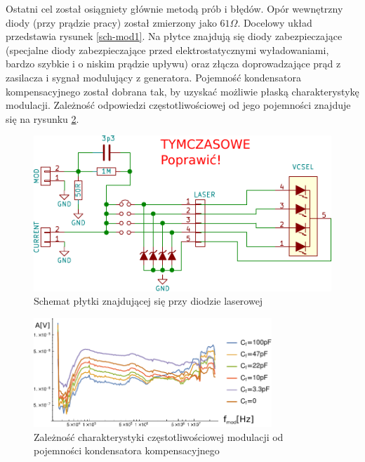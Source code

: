 \documentclass[a4paper,10pt]{article}
\begin{document}
Ostatni cel został osiągniety głównie metodą prób i błędów. Opór wewnętrzny diody (przy prądzie pracy) został zmierzony jako $61 \Omega$.
Docelowy układ przedstawia rysunek \ref{sch-mod1}. Na płytce znajdują się diody zabezpieczające (specjalne diody zabezpieczające przed elektrostatycznymi wyładowaniami, bardzo szybkie i o niskim prądzie upływu) oraz złącza doprowadzające prąd z zasilacza i sygnał modulujący z generatora. Pojemność kondensatora kompensacyjnego został dobrana tak, by uzyskać możliwie płaską charakterystykę modulacji. Zależność odpowiedzi częstotliwościowej od jego pojemności znajduje się na rysunku \ref{wyk-mod}.

\begin{figure}
\begin{center}
 \includegraphics{./obrazki/dings.pdf}
\end{center}
\caption{Schemat płytki znajdującej się przy diodzie laserowej}
\label{sch-mod}
\end{figure}

\begin{figure}
\begin{center}
 \includegraphics[width=0.8\textwidth]{./obrazki/bw.pdf}
\end{center}
\caption{Zależność charakterystyki częstotliwościowej modulacji od pojemności kondensatora kompensacyjnego}
\label{wyk-mod}
\end{figure}
\end{document}
